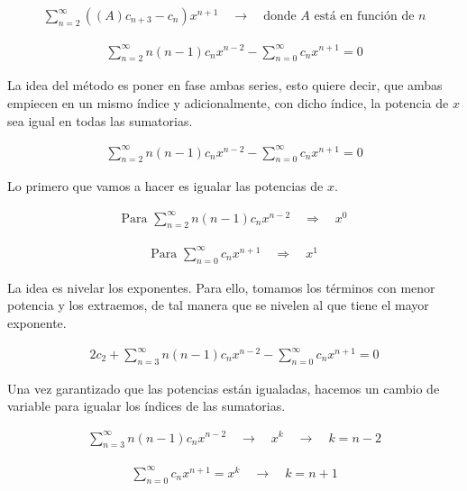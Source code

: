 \begin{gather*}
\sum _{n=2}^{\infty }(( A) c_{n+3} - c_{n}) x^{n+1} \quad \rightarrow \quad \text{donde } A \text{ está en función de } n
\end{gather*}

\begin{gather*}
\sum _{n=2}^{\infty } n( n-1) c_{n} x^{n-2} -\sum _{n=0}^{\infty } c_{n} x^{n+1} = 0
\end{gather*}

La idea del método es poner en fase ambas series,  
esto quiere decir, que ambas empiecen en un mismo índice  
y adicionalmente, con dicho índice, la potencia de \( x \)  
sea igual en todas las sumatorias.

\begin{gather*}
\sum _{n=2}^{\infty } n( n-1) c_{n} x^{n-2} -\sum _{n=0}^{\infty } c_{n} x^{n+1} = 0
\end{gather*}

Lo primero que vamos a hacer es igualar las potencias de \( x \).

\begin{gather*}
\text{Para } \sum _{n=2}^{\infty } n( n-1) c_{n} x^{n-2} \quad \Longrightarrow \quad x^{0}
\end{gather*}

\begin{gather*}
\text{Para } \sum _{n=0}^{\infty } c_{n} x^{n+1} \quad \Longrightarrow \quad x^{1}
\end{gather*}

La idea es nivelar los exponentes. Para ello, tomamos los términos con menor potencia y los extraemos, de tal manera que se nivelen al que tiene el mayor exponente.

\begin{gather*}
2c_{2} +\sum _{n=3}^{\infty } n( n-1) c_{n} x^{n-2} -\sum _{n=0}^{\infty } c_{n} x^{n+1} = 0
\end{gather*}

Una vez garantizado que las potencias están igualadas,  
hacemos un cambio de variable para igualar los índices  
de las sumatorias.

\begin{gather*}
\sum _{n=3}^{\infty } n( n-1) c_{n} x^{n-2} \quad \rightarrow \quad x^{k} \quad \rightarrow \quad k = n-2
\end{gather*}

\begin{gather*}
\sum _{n=0}^{\infty } c_{n} x^{n+1} = x^{k} \quad \rightarrow \quad k = n+1
\end{gather*}

